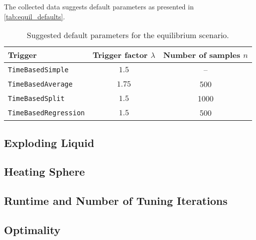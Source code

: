 The collected data suggests default parameters as presented in \autoref{tab:equil_defaults}.
\begin{table}[htpb]
	\centering
	\begin{tabular}{lcc}
		\toprule
		\textbf{Trigger}                      & \textbf{Trigger factor $\lambda$} & \textbf{Number of samples $n$} \\ [0em]
		\midrule
		\texttt{TimeBasedSimple}     & $1.5$                   & --                     \\
		\texttt{TimeBasedAverage}    & $1.75$                   & 500                   \\
		\texttt{TimeBasedSplit}      & $1.5$                    & 1000                  \\
		\texttt{TimeBasedRegression} & $1.5$                    & 500                  \\
		\bottomrule
	\end{tabular}
	\caption{Suggested default parameters for the equilibrium scenario.}
	\label{tab:equil_defaults}
\end{table}



\subsection{Exploding Liquid}
\subsection{Heating Sphere}





\subsection{Runtime and Number of Tuning Iterations}
\subsection{Optimality}



